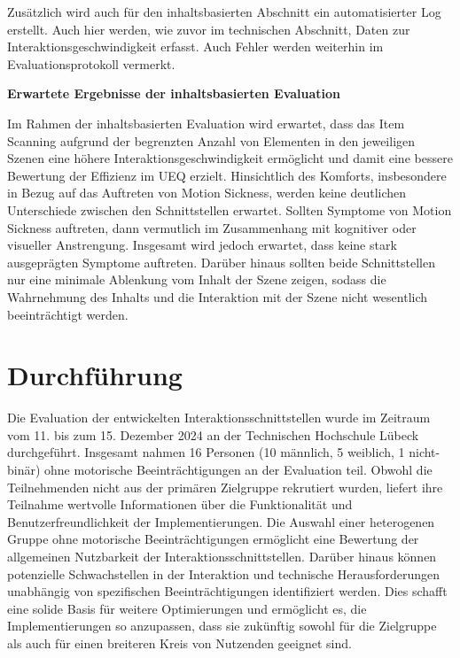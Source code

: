 Zusätzlich wird auch für den inhaltsbasierten Abschnitt ein automatisierter Log erstellt. Auch hier werden, wie zuvor im technischen Abschnitt, Daten zur Interaktionsgeschwindigkeit erfasst. Auch Fehler werden weiterhin im Evaluationsprotokoll vermerkt. 

\textbf{Erwartete Ergebnisse der inhaltsbasierten Evaluation}

Im Rahmen der inhaltsbasierten Evaluation wird erwartet, dass das Item Scanning aufgrund der begrenzten Anzahl von Elementen in den jeweiligen Szenen eine höhere Interaktionsgeschwindigkeit ermöglicht und damit eine bessere Bewertung der Effizienz im UEQ erzielt. Hinsichtlich des Komforts, insbesondere in Bezug auf das Auftreten von Motion Sickness, werden keine deutlichen Unterschiede zwischen den Schnittstellen erwartet. Sollten Symptome von Motion Sickness auftreten, dann vermutlich im Zusammenhang mit kognitiver oder visueller Anstrengung. Insgesamt wird jedoch erwartet, dass keine stark ausgeprägten Symptome auftreten.
Darüber hinaus sollten beide Schnittstellen nur eine minimale Ablenkung vom Inhalt der Szene zeigen, sodass die Wahrnehmung des Inhalts und die Interaktion mit der Szene nicht wesentlich beeinträchtigt werden.


\section{Durchführung}

Die Evaluation der entwickelten Interaktionsschnittstellen wurde im Zeitraum vom 11. bis zum 15. Dezember 2024 an der Technischen Hochschule Lübeck durchgeführt. Insgesamt nahmen 16 Personen (10 männlich, 5 weiblich, 1 nicht-binär) ohne motorische Beeinträchtigungen an der Evaluation teil. Obwohl die Teilnehmenden nicht aus der primären Zielgruppe rekrutiert wurden, liefert ihre Teilnahme wertvolle Informationen über die Funktionalität und Benutzerfreundlichkeit der Implementierungen. Die Auswahl einer heterogenen Gruppe ohne motorische Beeinträchtigungen ermöglicht eine Bewertung der allgemeinen Nutzbarkeit der Interaktionsschnittstellen. Darüber hinaus können potenzielle Schwachstellen in der Interaktion und technische Herausforderungen unabhängig von spezifischen Beeinträchtigungen identifiziert werden. Dies schafft eine solide Basis für weitere Optimierungen und ermöglicht es, die Implementierungen so anzupassen, dass sie zukünftig sowohl für die Zielgruppe als auch für einen breiteren Kreis von Nutzenden geeignet sind.

